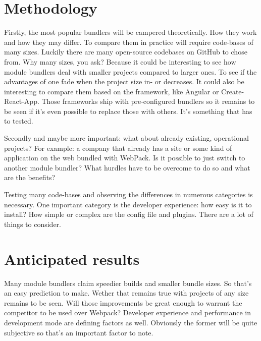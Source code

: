 \section{Methodology}
\label{sec:methodologie}

Firstly, the most popular bundlers will be campered theoretically. How they work and how they may differ. 
To compare them in practice will require code-bases of many sizes. Luckily there are many open-source codebases on GitHub to chose from. Why many sizes, you ask? Because it could be interesting to see how module bundlers deal with smaller projects compared to larger ones. To see if the advantages of one fade when the project size in- or decreases. It could also be interesting to compare them based on the framework, like Angular or Create-React-App. Those frameworks ship with pre-configured bundlers so it remains to be seen if it's even possible to replace those with others. It's something that has to tested.

Secondly and maybe more important: what about already existing, operational projects? For example: a company that already has a site or some kind of application on the web bundled with WebPack. Is it possible to just switch to another module bundler? What hurdles have to be overcome to do so and what are the benefits? 

Testing many code-bases and observing the differences in numerous categories is necessary. One important category is the developer experience: how easy is it to install? How simple or complex are the config file and plugins. There are a lot of things to consider. 

\section{Anticipated results}
\label{sec:verwachte_resultaten}

Many module bundlers claim speedier builds and smaller bundle sizes. So that's an easy prediction to make. Wether that remains true with projects of any size remains to be seen. Will those improvements be great enough to warrant the competitor to be used over Webpack? Developer experience and performance in development mode are defining factors as well. Obviously the former will be quite subjective so that's an important factor to note.

